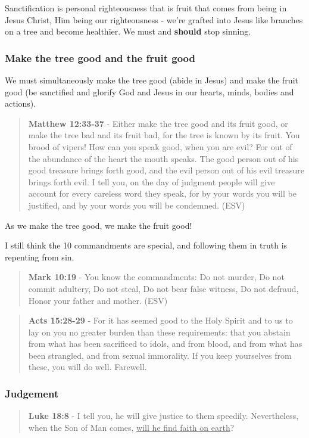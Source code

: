 \documentclass[11pt]{article}
\begin{document}
Sanctification is personal righteousness that is fruit that comes from being in Jesus Christ, Him being our righteousness - we're grafted into Jesus like branches on a tree and become healthier. We must and \textbf{should} stop sinning.

\subsubsection{Make the tree good and the fruit good}
\label{sec:orgb309914}

We must simultaneously make the tree good (abide in Jesus) and make the fruit good (be sanctified and glorify God and Jesus in our hearts, minds, bodies and actions).

\begin{quote}
\textbf{Matthew 12:33-37} - Either make the tree good and its fruit good, or make the tree bad and its fruit bad, for the tree is known by its fruit. You brood of vipers! How can you speak good, when you are evil? For out of the abundance of the heart the mouth speaks. The good person out of his good treasure brings forth good, and the evil person out of his evil treasure brings forth evil. I tell you, on the day of judgment people will give account for every careless word they speak, for by your words you will be justified, and by your words you will be condemned. (ESV)
\end{quote}

As we make the tree good, we make the fruit good!

I still think the 10 commandments are special, and following them in truth is repenting from sin.

\begin{quote}
\textbf{Mark 10:19} - You know the commandments: Do not murder, Do not commit adultery, Do not steal, Do not bear false witness, Do not defraud, Honor your father and mother. (ESV)
\end{quote}

\begin{quote}
\textbf{Acts 15:28-29} - For it has seemed good to the Holy Spirit and to us to lay on you no greater burden than these requirements: that you abstain from what has been sacrificed to idols, and from blood, and from what has been strangled, and from sexual immorality. If you keep yourselves from these, you will do well. Farewell.
\end{quote}

\subsubsection{Judgement}
\label{sec:orgf6ac27a}
\begin{quote}
\textbf{Luke 18:8} - I tell you, he will give justice to them speedily. Nevertheless, when the Son of Man comes, \uline{will he find faith on earth}?
\end{quote}
\end{document}
